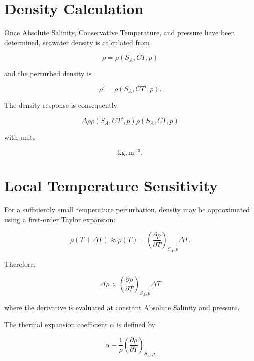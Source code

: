 \documentclass[11pt]{article}
\begin{document}
\section{Density Calculation}

Once Absolute Salinity, Conservative Temperature, and pressure have
been determined, seawater density is calculated from

\begin{equation}
\boxed{
\rho=\rho(S_A,CT,p)
}
\end{equation}

and the perturbed density is

\begin{equation}
\boxed{
\rho'=\rho(S_A,CT',p).
}
\end{equation}

The density response is consequently

\begin{equation}
\boxed{
\Delta\rho
\rho(S_A,CT',p)
\rho(S_A,CT,p)
}
\end{equation}

with units

\begin{equation}
[\Delta\rho]
\mathrm{kg,m^{-3}}.
\end{equation}
\section{Local Temperature Sensitivity}

For a sufficiently small temperature perturbation, density may be
approximated using a first-order Taylor expansion:

\begin{equation}
\rho(T+\Delta T)
\approx
\rho(T)
+
\left(
\frac{\partial\rho}{\partial T}
\right)_{S_A,p}
\Delta T.
\end{equation}

Therefore,

\begin{equation}
\boxed{
\Delta\rho
\approx
\left(
\frac{\partial\rho}{\partial T}
\right)_{S_A,p}
\Delta T
}
\end{equation}

where the derivative is evaluated at constant Absolute Salinity and
pressure.

The thermal expansion coefficient $\alpha$ is defined by

\begin{equation}
\boxed{
\alpha
-\frac{1}{\rho}
\left(
\frac{\partial\rho}{\partial T}
\right)_{S_A,p}
}
\end{equation}
\end{document}
